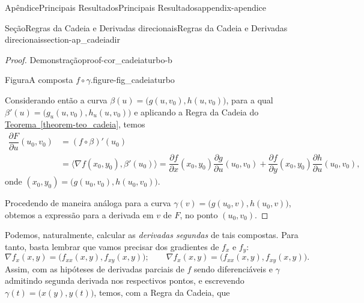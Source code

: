 \documentclass[oneside,10pt,]{book}
\newcommand{\xreffont}{\relax}
\numberwithin{equation}{section}
\begin{document}
\begin{appendixptx}{Apêndice}{Principais Resultados}{}{Principais Resultados}{}{}{appendix-apendice}
\begin{sectionptx}{Seção}{Regras da Cadeia e Derivadas direcionais}{}{Regras da Cadeia e Derivadas direcionais}{}{}{section-ap_cadeiadir}
\begin{proof}{Demonstração}{}{proof-cor_cadeiaturbo-b}
\begin{figureptx}{Figura}{A composta \(f\circ\gamma\).}{figure-fig_cadeiaturbo}{}
\begin{image}{0.05}{0.9}{0.05}{}
{
}%
\end{image}%
\tcblower
\end{figureptx}%
%
\par
Considerando então a curva \(\beta(u)=\big(g(u,v_0),h(u,v_0)\big)\), para a qual \(\beta'(u)=\big(g_u(u,v_0),h_u(u,v_0)\big)\) e aplicando a Regra da Cadeia do \hyperref[theorem-teo_cadeia]{Teorema~{\xreffont\ref{theorem-teo_cadeia}}}, temos%
\begin{align*}
\dfrac{\partial F}{\partial u}(u_0,v_0)&
=(f\circ\beta)'(u_0)\\
&=\big\langle \nabla f(x_0,y_0),\beta'(u_0)\big\rangle=
\dfrac{\partial f}{\partial x}(x_0,y_0)\dfrac{\partial g}{\partial
u}(u_0,v_0)+\dfrac{\partial f}{\partial y}(x_0,y_0)\dfrac{\partial
h}{\partial u}(u_0,v_0),
\end{align*}
onde \((x_0,y_0)=\big(g(u_0,v_0),h(u_0,v_0)\big)\).%
\par
Procedendo de maneira análoga para a curva \(\gamma(v)=\big(g(u_0,v),h(u_0,v)\big)\), obtemos a expressão para a derivada em \(v\) de \(F\), no ponto \((u_0,v_0)\).%
\end{proof}
Podemos, naturalmente, calcular as \emph{derivadas segundas} de tais compostas. Para tanto, basta lembrar que vamos precisar dos gradientes de \(f_x\) e \(f_y\):%
\begin{equation*}
\nabla
f_x(x,y)=\big(f_{xx}(x,y),f_{xy}(x,y)\big); \qquad \nabla
f_x(x,y)=\big(f_{xx}(x,y),f_{xy}(x,y)\big).
\end{equation*}
Assim, com as hipóteses de derivadas parciais de \(f\) sendo diferenciáveis e \(\gamma\) admitindo segunda derivada nos respectivos pontos, e escrevendo \(\gamma(t)=\big(x(y),y(t)\big)\), temos, com a Regra da Cadeia, que%

\end{sectionptx}
\end{appendixptx}
\end{document}
